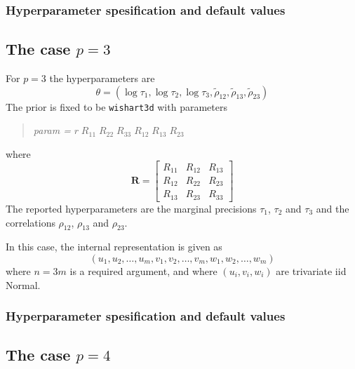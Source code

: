 \documentclass[a4paper,11pt]{article}
\begin{document}
\subsubsection*{Hyperparameter spesification and default values}



\subsection*{The case $p=3$}

For $p=3$ the
hyperparameters are
\begin{displaymath}
    \theta = (\log \tau_{1}, \log \tau_{2}, \log \tau_{3},
    \tilde\rho_{12},
    \tilde\rho_{13},
    \tilde\rho_{23})
\end{displaymath}
The prior is fixed to be \texttt{wishart3d} with parameters
\begin{quote}
    \emph{param = } $r\;R_{11}\;R_{22}\;R_{33}\; R_{12}\;
    R_{13}\; R_{23}$
\end{quote}
where
\begin{displaymath}
    \mathbf{R} =
    \left[\begin{array}{ccc}
        R_{11} &R_{12} & R_{13}\\
        R_{12} & R_{22} & R_{23}\\
        R_{13} & R_{23} & R_{33}
    \end{array}\right]
\end{displaymath}
The reported hyperparameters are the marginal precisions $\tau_{1}$,
$\tau_{2}$ and $\tau_{3}$ and the correlations $\rho_{12}$,
$\rho_{13}$ and $\rho_{23}$.

In this case, the internal representation is given as
\begin{displaymath}
    (u_{1}, u_{2}, \ldots, u_{m}, v_{1}, v_{2}, \ldots, v_{m},
    w_{1}, w_{2}, \ldots, w_{m})
\end{displaymath}
where $n=3m$ is a required argument, and where $(u_{i}, v_{i}, w_{i})$
are trivariate iid Normal.

\subsubsection*{Hyperparameter spesification and default values}


\subsection*{The case $p=4$}
\end{document}
